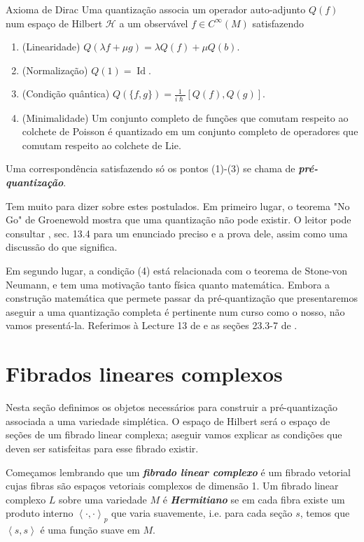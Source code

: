\begin{thing5}{Axioma de Dirac}\leavevmode
Uma quantização associa um operador auto-adjunto $Q(f)$ num espaço de Hilbert $\mathcal{H}$ a um observável $f \in C^\infty(M)$ satisfazendo
\begin{enumerate}
\item (Linearidade) $Q(\lambda f + \mu g)=\lambda Q(f)+\mu Q(b)$.
\item (Normalização) $Q(1)=\operatorname{Id}$.
\item (Condição quântica) $Q(\{f,g\})=\frac{1}{i\hslash}[Q(f),Q(g)]$.
\item (Minimalidade) Um conjunto completo de funções que comutam respeito ao colchete de Poisson é quantizado em um conjunto completo de operadores que comutam respeito ao colchete de Lie.
\end{enumerate}
\end{thing5}
Uma correspondência satisfazendo só os pontos (1)-(3) se chama de \textit{\textbf{pré-quantização}}.

Tem muito para dizer sobre estes postulados. Em primeiro lugar, o teorema "No Go" de Groenewold mostra que uma quantização não pode existir. O leitor pode consultar  \cite{hallq}, sec. 13.4 para um enunciado preciso e a prova dele, assim como uma discussão do que significa.

Em segundo lugar, a condição (4) está relacionada com o teorema de Stone-von Neumann, e tem uma motivação tanto física quanto matemática. Embora a construção matemática que permete passar da pré-quantização que presentaremos aseguir a uma quantização completa é pertinente num curso como o nosso, não vamos presentá-la. Referimos à Lecture 13 de \cite{wang} e as seções 23.3-7 de \cite{hallq}.

\section{Fibrados lineares complexos} 

Nesta seção definimos os objetos necessários para construir a pré-quantização associada a uma variedade simplética. O espaço de Hilbert será o espaço de seções de um fibrado linear complexa; aseguir vamos explicar as condições que deven ser satisfeitas para esse fibrado existir.

Começamos lembrando que um \textit{\textbf{fibrado linear complexo}} é um fibrado vetorial cujas fibras são espaços vetoriais complexos de dimensão 1. Um fibrado linear complexo $L$ sobre uma variedade $M$ é \textit{\textbf{Hermitiano}} se em cada fibra existe um produto interno $\left<\cdot,\cdot\right>_p$ que varia suavemente, i.e. para cada seção $s$, temos que $\left<s,s\right>$ é uma função suave em $M$.

